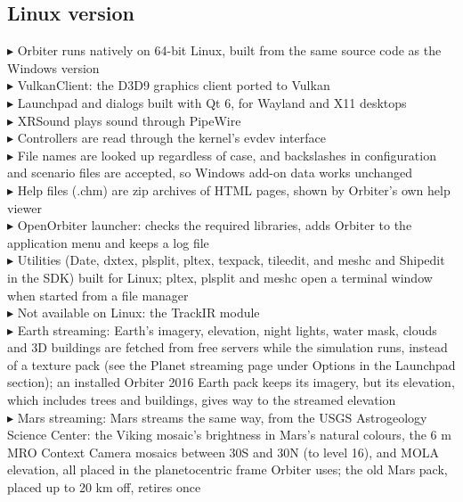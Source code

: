 \documentclass[Orbiter User Manual.tex]{subfiles}
\begin{document}
\subsection{Linux version}
$\blacktriangleright$ Orbiter runs natively on 64-bit Linux, built from the same source code as the Windows version\\
$\blacktriangleright$ VulkanClient: the D3D9 graphics client ported to Vulkan\\
$\blacktriangleright$ Launchpad and dialogs built with Qt 6, for Wayland and X11 desktops\\
$\blacktriangleright$ XRSound plays sound through PipeWire\\
$\blacktriangleright$ Controllers are read through the kernel's evdev interface\\
$\blacktriangleright$ File names are looked up regardless of case, and backslashes in configuration and scenario files are accepted, so Windows add-on data works unchanged\\
$\blacktriangleright$ Help files (.chm) are zip archives of HTML pages, shown by Orbiter's own help viewer\\
$\blacktriangleright$ OpenOrbiter launcher: checks the required libraries, adds Orbiter to the application menu and keeps a log file\\
$\blacktriangleright$ Utilities (Date, dxtex, plsplit, pltex, texpack, tileedit, and meshc and Shipedit in the SDK) built for Linux; pltex, plsplit and meshc open a terminal window when started from a file manager\\
$\blacktriangleright$ Not available on Linux: the TrackIR module\\
$\blacktriangleright$ Earth streaming: Earth's imagery, elevation, night lights, water mask, clouds and 3D buildings are fetched from free servers while the simulation runs, instead of a texture pack (see the Planet streaming page under Options in the Launchpad section); an installed Orbiter 2016 Earth pack keeps its imagery, but its elevation, which includes trees and buildings, gives way to the streamed elevation\\
$\blacktriangleright$ Mars streaming: Mars streams the same way, from the USGS Astrogeology Science Center: the Viking mosaic's brightness in Mars's natural colours, the 6 m MRO Context Camera mosaics between 30\textdegree{}S and 30\textdegree{}N (to level 16), and MOLA elevation, all placed in the planetocentric frame Orbiter uses; the old Mars pack, placed up to 20 km off, retires once\\
\end{document}
